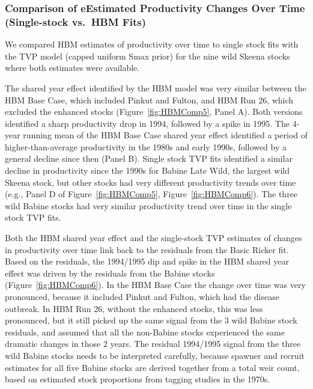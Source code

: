 \documentclass[french,11pt]{book}
\begin{document}
\subsubsection{Comparison of eEstimated Productivity Changes Over Time (Single-stock vs.~HBM Fits)}\label{comparison-of-eestimated-productivity-changes-over-time-single-stock-vs.-hbm-fits}

We compared HBM estimates of productivity over time to single stock fits with the TVP model (capped uniform Smax prior) for the nine wild Skeena stocks where both estimates were available.

The shared year effect identified by the HBM model was very similar between the HBM Base Case, which included Pinkut and Fulton, and HBM Run 26, which excluded the enhanced stocks (Figure~\ref{fig:HBMComp5}, Panel A). Both versions identified a sharp productivity drop in 1994, followed by a spike in 1995. The 4-year running mean of the HBM Base Case shared year effect identified a period of higher-than-average productivity in the 1980s and early 1990s, followed by a general decline since then (Panel B). Single stock TVP fits identified a similar decline in productivity since the 1990s for Babine Late Wild, the largest wild Skeena stock, but other stocks had very different productivity trends over time (e.g., Panel D of Figure~\ref{fig:HBMComp5}, Figure~\ref{fig:HBMComp6}). The three wild Babine stocks had very similar productivity trend over time in the single stock TVP fits.

Both the HBM shared year effect and the single-stock TVP estimates of changes in productivity over time link back to the residuals from the Basic Ricker fit. Based on the residuals, the 1994/1995 dip and spike in the HBM shared year effect was driven by the residuals from the Babine stocks (Figure~\ref{fig:HBMComp6}). In the HBM Base Case the change over time was very pronounced, because it included Pinkut and Fulton, which had the disease outbreak. In HBM Run 26, without the enhanced stocks, this was less pronounced, but it still picked up the same signal from the 3 wild Babine stock residuals, and assumed that all the non-Babine stocks experienced the same dramatic changes in those 2 years. The residual 1994/1995 signal from the three wild Babine stocks needs to be interpreted carefully, because spawner and recruit estimates for all five Babine stocks are derived together from a total weir count, based on estimated stock proportions from tagging studies in the 1970s.
\end{document}
